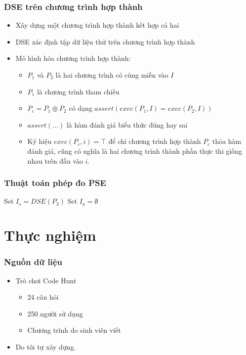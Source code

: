 \documentclass{beamer}
\begin{document}
\begin{frame}
  \frametitle{DSE trên chương trình hợp thành}
  \begin{itemize}
  	\item Xây dựng một chương trình hợp thành kết hợp cả hai
  	\item DSE xác định tập dữ liệu thử trên chương trình hợp thành
  	\item Mô hình hóa chương trình hợp thành:
  	\begin{itemize}
  		\item $P_1$ và $P_2$ là hai chương trình có cùng miền vào $I$
  		\item $P_1$ là chương trình tham chiếu
  		\item $P_c = P_1 \oplus P_2$ có dạng
  		$assert(exec(P_{1}, I) = exec(P_{2}, I))$
  		\item  $assert(\dots)$ là hàm đánh giá biểu thức đúng hay sai
  		\item Ký hiệu $exec(P_c,i) = \top$ để chỉ
  		chương trình hợp thành $P_c$ thỏa hàm đánh giá, cũng có nghĩa là hai
  		chương trình thành phần thực thi giống nhau trên đầu vào $i$.
  	\end{itemize}
  \end{itemize}
\end{frame}


\begin{frame}
  \frametitle{Thuật toán phép đo PSE}
  \begin{algorithm}[H]
  	Set $I_{s} = DSE(P_{3})$ \;
  	Set $I_{a} = \emptyset$ \;
  	{  			
  	}
  \end{algorithm}
\end{frame}


\section{Thực nghiệm}

\begin{frame}
  \frametitle{Nguồn dữ liệu}
  \begin{itemize}
  	\item Trò chơi Code Hunt
  	\begin{itemize}
  		\item 24 câu hỏi
  		\item 250 người sử dụng
  		\item Chương trình do sinh viên viết
  	\end{itemize}
  	\item Do tôi tự xây dựng. 
  \end{itemize}
\end{frame}
\end{document}
